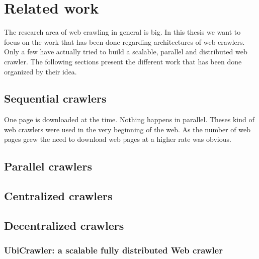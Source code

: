 
\chapter{Related work} %

The research area of web crawling in general is big. In this thesis we want to focus on the work that has been done regarding architectures of web crawlers. Only a few have actually tried to build a scalable, parallel and distributed web crawler. The following sections present the different work that has been done organized by their idea.

\label{Chapter2} %


\section{Sequential crawlers}
One page is downloaded at the time. Nothing happens in parallel. Theses kind of web crawlers were used in the very beginning of the web. As the number of web pages grew the need to download web pages at a higher rate was obvious.


\section{Parallel crawlers}
\section{Centralized crawlers}
\section{Decentralized crawlers}

\subsection{UbiCrawler: a scalable fully distributed Web crawler \cite{ubicrawler}}

